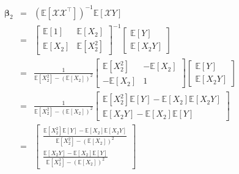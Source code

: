 \documentclass{article}
\begin{document}
\begin{eqnarray*}
\mathbf{\beta }_{2} &=&\left( \mathbb{E}\left[ \mathcal{XX}^{\intercal }%
\right] \right) ^{-1}\mathbb{E}\left[ \mathcal{X}Y\right] \\
&=&\left[ 
\begin{array}{cc}
\mathbb{E}\left[ 1\right] & \mathbb{E}\left[ X_{2}\right] \\ 
\mathbb{E}\left[ X_{2}\right] & \mathbb{E}\left[ X_{2}^{2}\right]%
\end{array}%
\right] ^{-1}\left[ 
\begin{array}{c}
\mathbb{E}\left[ Y\right] \\ 
\mathbb{E}\left[ X_{2}Y\right]%
\end{array}%
\right] \\
&=&\frac{1}{\mathbb{E}\left[ X_{2}^{2}\right] -\left( \mathbb{E}\left[ X_{2}%
\right] \right) ^{2}}\left[ 
\begin{array}{cc}
\mathbb{E}\left[ X_{2}^{2}\right] & -\mathbb{E}\left[ X_{2}\right] \\ 
-\mathbb{E}\left[ X_{2}\right] & 1%
\end{array}%
\right] \left[ 
\begin{array}{c}
\mathbb{E}\left[ Y\right] \\ 
\mathbb{E}\left[ X_{2}Y\right]%
\end{array}%
\right] \\
&=&\frac{1}{\mathbb{E}\left[ X_{2}^{2}\right] -\left( \mathbb{E}\left[ X_{2}%
\right] \right) ^{2}}\left[ 
\begin{array}{c}
\mathbb{E}\left[ X_{2}^{2}\right] \mathbb{E}\left[ Y\right] -\mathbb{E}\left[
X_{2}\right] \mathbb{E}\left[ X_{2}Y\right] \\ 
\mathbb{E}\left[ X_{2}Y\right] -\mathbb{E}\left[ X_{2}\right] \mathbb{E}%
\left[ Y\right]%
\end{array}%
\right] \\
&=&\left[ 
\begin{array}{c}
\frac{\mathbb{E}\left[ X_{2}^{2}\right] \mathbb{E}\left[ Y\right] -\mathbb{E}%
\left[ X_{2}\right] \mathbb{E}\left[ X_{2}Y\right] }{\mathbb{E}\left[
X_{2}^{2}\right] -\left( \mathbb{E}\left[ X_{2}\right] \right) ^{2}} \\ 
\frac{\mathbb{E}\left[ X_{2}Y\right] -\mathbb{E}\left[ X_{2}\right] \mathbb{E%
}\left[ Y\right] }{\mathbb{E}\left[ X_{2}^{2}\right] -\left( \mathbb{E}\left[
X_{2}\right] \right) ^{2}}%
\end{array}%
\right]
\end{eqnarray*}
\end{document}
